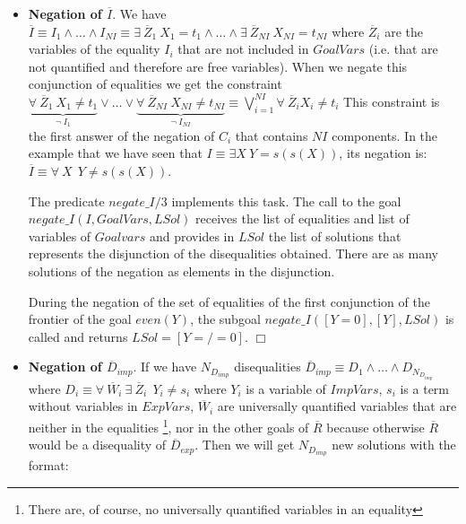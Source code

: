 \documentclass{tlp}
\newcommand{\implementation}[1]{\noindent{\sc Implementation details:}
  #1 $\Box$}
\begin{document}
        \begin{itemize}

           \item {\bf Negation of $\overline{I}$}. We have $\overline{I}
           \equiv I_1 \wedge \ldots \wedge I_{NI} \equiv \exists~
           \overline{Z}_1~ X_1 = t_1 \wedge \ldots \wedge \exists~
           \overline{Z}_{NI}~ X_{NI} = t_{NI} $ where
           $\overline{Z}_i$ are the variables of the equality $I_i$ that
           are not included in $GoalVars$ (i.e. that are not quantified
           and therefore are free variables). When we negate this
           conjunction of equalities we get the constraint 
                $
           \underbrace{\forall~ \overline{Z}_1~ X_1 \neq t_1} _{\neg~
           I_1} \vee \ldots \vee \underbrace{\forall~
           \overline{Z}_{NI}~ X_{NI} \neq t_{NI} } _{\neg~ I_{NI}}
           \equiv %
           \bigvee_{i=1}^{NI} \forall~ \overline{Z}_i X_i
           \neq t_i $ 
           This constraint is the first answer of the negation of $C_i$ that
           contains $NI$ components.  In the example that we have seen that $
           I \equiv \exists X ~ Y=s(s(X))$, its negation is: $\overline{I}
           \equiv \forall~ X~~ Y \neq s(s(X))$.

\implementation{
The predicate $negate\_I/3$ implements this
task. The call to the goal $negate\_I(I,GoalVars,LSol)$ receives the list of
equalities and list of variables of $Goalvars$ and provides in $LSol$ the list
of solutions that represents the disjunction of the disequalities
obtained. There are as many solutions of the negation as elements in the
disjunction.   

During the negation of the set of equalities of the first conjunction of the
frontier of the goal $even(Y)$, the subgoal $negate\_I([Y=0],[Y],LSol)$ is
called and returns $LSol=[Y=/=0]$.
}

           \item {\bf Negation of $\overline{D}_{imp}$}. If we have
           $N_{D_{imp}}$ disequalities $\overline{D}_{imp} \equiv D_1
           \wedge \ldots \wedge D_{N_{D_{imp}}}$ where $ D_i \equiv
           \forall~ \overline{W}_i ~ \exists~ \overline{Z}_i ~~  Y_i
           \neq s_i$ where $Y_i$ is a variable of $ImpVars$, $s_i$ is
           a term without variables in $ExpVars$, $\overline{W}_i$ are
           universally quantified variables that are neither in the
           equalities \footnote{There are, of course, no universally
           quantified variables in an equality}, nor in the other
           goals of $\overline{R}$ because otherwise $\overline{R}$
           would be a disequality of $\overline{D}_{exp}$. Then we
           will get $N_{D_{imp}}$ new solutions with the format: 


\end{itemize}
\end{document}
